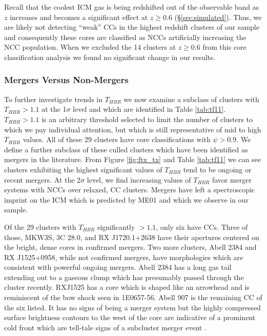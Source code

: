 \documentclass{emulateapj}
\begin{document}
Recall that the coolest ICM gas is being redshifted out of the
observable band as $z$ increases and becomes a significant effect at
$z \geq 0.6$ (\S\ref{sec:simulated}). Thus, we are likely not detecting
``weak'' CCs in the highest redshift clusters of our sample and
consequently these cores are classified as NCCs artificially increasing
the NCC population. When we excluded the 14 clusters at $z \geq 0.6$
from this core classification analysis we found no significant change
in our results.

\subsubsection{Mergers Versus Non-Mergers}\label{sec:merge}

To further investigate trends in $T_{HBR}$ we now examine a subclass of
clusters with $T_{HBR} > 1.1$ at the 1$\sigma$ level and which are
identified in Table \ref{tab:tf11}. $T_{HBR} > 1.1$ is an arbitrary
threshold selected to limit the number of clusters to which we pay
individual attention, but which is still representative of mid to high
$T_{HBR}$ values. All of these 29 clusters have core classifications 
with $\psi > 0.9$. We define a further subclass of these culled
clusters which have been identified as mergers in the literature. From Figure
\ref{fig:ftx_tx} and Table \ref{tab:tf11} we can see clusters
exhibiting the highest significant values of $T_{HBR}$ tend to be ongoing or
recent mergers. At the 2$\sigma$ level, we find increasing values of
$T_{HBR}$ favor merger systems with NCCs over relaxed, CC clusters. Mergers
have left a spectroscopic imprint on the ICM which is predicted by
ME01 and which we observe in our sample.

Of the 29 clusters with $T_{HBR}$ significantly $> 1.1$, only six have
CCs. Three of those, MKW3S, 3C 28.0, and RX J1720.1+2638 have their
apertures centered on the bright, dense cores in confirmed
mergers. Two more clusters, Abell 2384 and RX J1525+0958, while
not confirmed mergers, have morphologies which are consistent with
powerful ongoing mergers. Abell 2384 has a long gas tail extending out
to a gaseous clump which has presumably passed through the cluster
recently. RXJ1525 has a core which is shaped like an arrowhead and is
reminiscent of the bow shock seen in 1E0657-56. Abell 907 is the
remaining CC of the six listed. It has no signs of being a merger
system but the highly compressed surface brightness contours to the
west of the core are indicative of a prominent cold front which are
tell-tale signs of a subcluster merger event
\citep{2007PhR...443....1M}.
\end{document}

